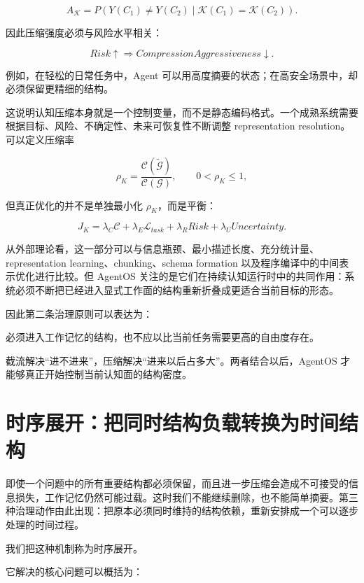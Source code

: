 \[
A_{\mathcal K}
=
P
\left(
Y(C_1)\neq Y(C_2)
\mid
\mathcal K(C_1)=\mathcal K(C_2)
\right).
\]

因此压缩强度必须与风险水平相关：

\[
Risk\uparrow
\Rightarrow
CompressionAggressiveness\downarrow.
\]

例如，在轻松的日常任务中，Agent 可以用高度摘要的状态；在高安全场景中，却必须保留更精细的结构。

这说明认知压缩本身就是一个控制变量，而不是静态编码格式。一个成熟系统需要根据目标、风险、不确定性、未来可恢复性不断调整 representation resolution。可以定义压缩率

\[
\rho_K
=
\frac{\mathcal C(\widetilde{\mathcal G})}
{\mathcal C(\mathcal G)},
\qquad
0<\rho_K\leq1,
\]

但真正优化的并不是单独最小化 $\rho_K$，而是平衡：

\[
J_K
=
\lambda_C\mathcal C
+
\lambda_E\mathcal L_{task}
+
\lambda_R Risk
+
\lambda_U Uncertainty.
\]

从外部理论看，这一部分可以与信息瓶颈、最小描述长度、充分统计量、representation learning、chunking、schema formation 以及程序编译中的中间表示优化进行比较。但 AgentOS 关注的是它们在持续认知运行时中的共同作用：系统必须不断把已经进入显式工作面的结构重新折叠成更适合当前目标的形态。

因此第二条治理原则可以表达为：

\begin{proposition*}
必须进入工作记忆的结构，也不应以比当前任务需要更高的自由度存在。
\end{proposition*}

截流解决“进不进来”，压缩解决“进来以后占多大”。两者结合以后，AgentOS 才能够真正开始控制当前认知面的结构密度。

\section{时序展开：把同时结构负载转换为时间结构}

即使一个问题中的所有重要结构都必须保留，而且进一步压缩会造成不可接受的信息损失，工作记忆仍然可能过载。这时我们不能继续删除，也不能简单摘要。第三种治理动作由此出现：把原本必须同时维持的结构依赖，重新安排成一个可以逐步处理的时间过程。

我们把这种机制称为时序展开。

它解决的核心问题可以概括为：

\begin{statementbox}
\centering
{}
\end{statementbox}


